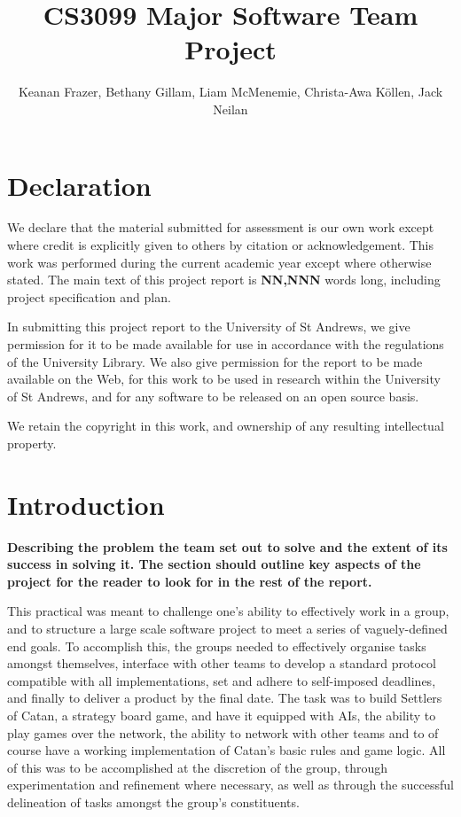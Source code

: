 \documentclass[a4paper,doc,draftfirst]{apa6}
\title{CS3099 Major Software Team Project}
\author{Keanan Frazer, Bethany Gillam, Liam McMenemie, Christa-Awa Köllen, Jack Neilan}
\affiliation{University of St Andrews}
\begin{document}
\maketitle




\section{Declaration}
We declare that the material submitted for assessment is our own work except where credit is explicitly given to others by citation or acknowledgement. This work was performed during the current academic year except where otherwise stated. The main text of this project report is \textbf{NN,NNN} words long, including project specification and plan.

In submitting this project report to the University of St Andrews, we give permission for it to be made available for use in accordance with the regulations of the University Library. We also give permission for the report to be made available on the Web, for this work to be used in research within the University of St Andrews, and for any software to be released on an open source basis.

We retain the copyright in this work, and ownership of any resulting intellectual property.




\newpage
\tableofcontents
\newpage




\section{Introduction}
\textbf{Describing the problem the team set out to solve and the extent of its success in solving it. The section should outline key aspects of the project for the reader to look for in the rest of the report.}

This practical was meant to challenge one’s ability to effectively work in a group, and to structure a large scale software project to meet a series of vaguely-defined end goals. To accomplish this, the groups needed to effectively organise tasks amongst themselves, interface with other teams to develop a standard protocol compatible with all implementations, set and adhere to self-imposed deadlines, and finally to deliver a product by the final date. The task was to build Settlers of Catan, a strategy board game, and have it equipped with AIs, the ability to play games over the network, the ability to network with other teams and to of course have a working implementation of Catan’s basic rules and game logic. All of this was to be accomplished at the discretion of the group, through experimentation and refinement where necessary, as well as through the successful delineation of tasks amongst the group’s constituents.
\end{document}

